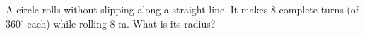 A circle rolls without slipping along a straight line. It makes $8$ complete turns (of $360^\circ$ each) while rolling $8$ m. What is its radius?
